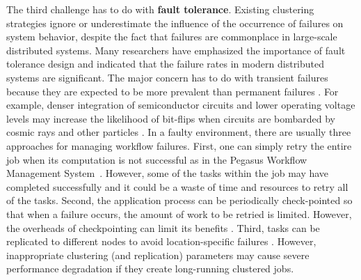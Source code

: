 


The third challenge has to do with \textbf{fault tolerance}. Existing clustering strategies ignore or underestimate the influence of the occurrence of failures on system behavior, despite the fact that failures are commonplace in large-scale distributed systems. Many researchers \cite{Zhang2004, Tang1990, Schroeder2006, Sahoo2004} have emphasized the importance of fault tolerance design and indicated that the failure rates in modern distributed systems are significant. The major concern has to do with transient failures because they are expected to be more prevalent than permanent failures \cite{Zhang2004}. For example, denser integration of semiconductor circuits and lower operating voltage levels may increase the likelihood of bit-flips when circuits are bombarded by cosmic rays and other particles \cite{Zhang2004}. In a faulty environment, there are usually three approaches for managing workflow failures. First, one can simply retry the entire job when its computation is not successful as in the Pegasus Workflow Management System~\cite{Deelman2004}. However, some of the tasks within the job may have completed successfully and it could be a waste of time and resources to retry all of the tasks. Second, the application process can be periodically check-pointed so that when a failure occurs, the amount of work to be retried is limited. However, the overheads of checkpointing can limit its benefits \cite{Zhang2004}. Third, tasks can be replicated to different nodes to avoid location-specific failures \cite{Zhang2009}. However, inappropriate clustering (and replication) parameters may cause severe performance degradation if they create long-running clustered jobs. 


